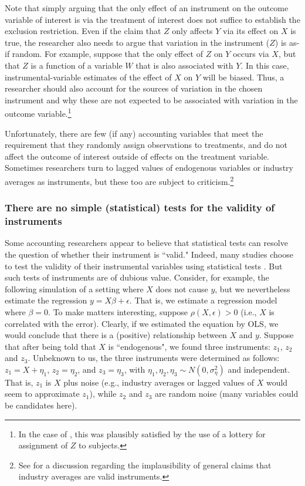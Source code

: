 \documentclass[12pt,reqno,titlepage]{amsart}
\theoremstyle{definition}
\begin{document}
\begin{doublespace}
Note that simply arguing that the only effect of an instrument on the outcome variable of interest is via the treatment of interest does not suffice to establish the exclusion restriction.
Even if the claim that $Z$ only affects $Y$ via its effect on $X$ is true, the researcher also needs to argue that variation in the instrument ($Z$) is as-if random.
For example, suppose that the only effect of $Z$ on $Y$ occurs via $X$, but that $Z$ is a function of a variable $W$ that is also associated with $Y$. 
In this case, instrumental-variable estimates of the effect of $X$ on $Y$ will be biased.
Thus, a researcher should also account for the sources of variation in the chosen instrument and why these are not expected to be associated with  variation in the outcome variable.\footnote{
In the case of \citet{Angrist:1990dk}, this was plausibly satisfied by the use of a lottery for assignment of $Z$ to subjects.}

Unfortunately, there are few (if any) accounting variables that meet the requirement that they randomly assign observations to treatments, and do not affect the outcome of interest outside of effects on the treatment variable.
Sometimes researchers turn to lagged values of endogenous variables or industry averages as instruments, but these too are subject to criticism.\footnote{
See \citet{Reiss:2007ej} for a discussion regarding the implausibility of general claims that industry averages are valid instruments.}  

\subsubsection{There are no simple (statistical) tests for the validity of instruments}

Some accounting researchers appear to believe that statistical tests can resolve the question of whether their instrument is ``valid."
Indeed, many studies choose to test the validity of their instrumental variables using statistical tests \citep[see][]{Larcker:2010fq}.
But such tests of instruments are of dubious value. 
Consider, for example, the following simulation of a setting where $X$ does not cause $y$, but we nevertheless estimate the regression $y = X \beta + \epsilon$. That is, we estimate a regression model
where $\beta = 0$. To make matters interesting, suppose $\rho(X, \epsilon) > 0$ (i.e., $X$ is correlated with the error). Clearly, if we estimated the equation by OLS, we would
conclude that there is a (positive) relationship between $X$ and $y$. 
Suppose that after being told that $X$ is ``endogenous", we found three instruments: $z_1$, $z_2$ and $z_3$. 
Unbeknown to us, the three instruments were determined as follows:
$z_1 = X +\eta_1$, $z_2 = \eta_2$, and $z_3 = \eta_3$, with $\eta_1, \eta_2,  \eta_3 \sim N(0, \sigma_{\eta}^2)$ and independent. 
That is, $z_1$ is $X$ plus noise (e.g., industry averages or lagged values of $X$ would seem to approximate $z_1$), while $z_2$ and $z_3$ are random noise (many variables could be candidates here).


\end{doublespace}
\end{document}
